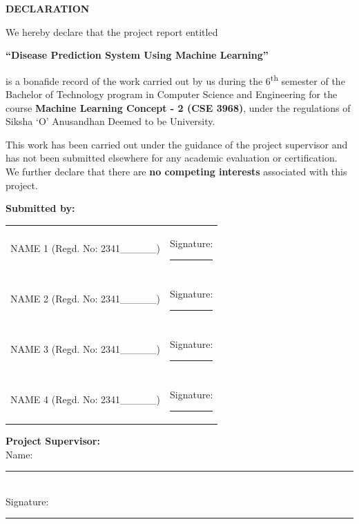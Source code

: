 \documentclass[12pt,a4paper]{article}
\begin{document}
\newpage

\newpage
\begin{center}

{\Large \textbf{DECLARATION}}\\[1cm]

\end{center}

\noindent
We hereby declare that the project report entitled

\begin{center}
\textbf{``Disease Prediction System Using Machine Learning''}
\end{center}

\noindent
is a bonafide record of the work carried out by us during the 6\textsuperscript{th} semester of the Bachelor of Technology program in Computer Science and Engineering for the course \textbf{Machine Learning Concept - 2 (CSE 3968)}, under the regulations of Siksha `O' Anusandhan Deemed to be University.

\vspace{0.5cm}

\noindent
This work has been carried out under the guidance of the project supervisor and has not been submitted elsewhere for any academic evaluation or certification. We further declare that there are \textbf{no competing interests} associated with this project.

\vspace{1cm}

\noindent
\textbf{Submitted by:}

\vspace{0.5cm}

\begin{tabular}{p{6cm} p{6cm}}
NAME 1 (Regd. No: 2341\_\_\_\_\_) & Signature: \rule{5cm}{0.4pt} \\
\\
NAME 2 (Regd. No: 2341\_\_\_\_\_) & Signature: \rule{5cm}{0.4pt} \\
\\
NAME 3 (Regd. No: 2341\_\_\_\_\_) & Signature: \rule{5cm}{0.4pt} \\
\\
NAME 4 (Regd. No: 2341\_\_\_\_\_) & Signature: \rule{5cm}{0.4pt} \\
\end{tabular}

\vspace{1.5cm}

\noindent
\textbf{Project Supervisor:} \\
\vspace{0.5cm}
Name: \rule{8cm}{0.4pt} \\
\vspace{0.3cm}
Signature: \rule{6cm}{0.4pt}
\end{document}
